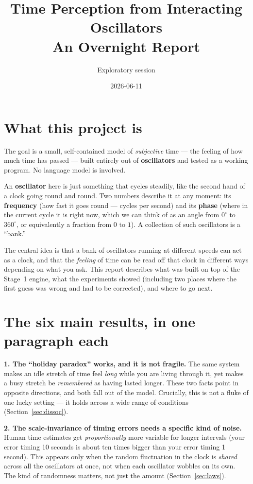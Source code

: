 \documentclass[11pt]{article}
\title{Time Perception from Interacting Oscillators\\\large An Overnight Report}
\author{Exploratory session}
\date{2026-06-11}
\begin{document}
\maketitle

\section*{What this project is}

The goal is a small, self-contained model of \emph{subjective} time --- the feeling
of how much time has passed --- built entirely out of \textbf{oscillators} and tested
as a working program. No language model is involved.

An \textbf{oscillator} here is just something that cycles steadily, like the second
hand of a clock going round and round. Two numbers describe it at any moment: its
\textbf{frequency} (how fast it goes round --- cycles per second) and its
\textbf{phase} (where in the current cycle it is right now, which we can think of as
an angle from $0^\circ$ to $360^\circ$, or equivalently a fraction from $0$ to $1$).
A collection of such oscillators is a ``bank.''

The central idea is that a bank of oscillators running at different speeds can act as
a clock, and that the \emph{feeling} of time can be read off that clock in different
ways depending on what you ask. This report describes what was built on top of the
Stage~1 engine, what the experiments showed (including two places where the first
guess was wrong and had to be corrected), and where to go next.

\section{The six main results, in one paragraph each}

\textbf{1. The ``holiday paradox'' works, and it is not fragile.}
The same system makes an idle stretch of time feel \emph{long} while you are living
through it, yet makes a busy stretch be \emph{remembered} as having lasted longer.
These two facts point in opposite directions, and both fall out of the model.
Crucially, this is not a fluke of one lucky setting --- it holds across a wide range
of conditions (Section~\ref{sec:dissoc}).

\textbf{2. The scale-invariance of timing errors needs a specific kind of noise.}
Human time estimates get \emph{proportionally} more variable for longer intervals
(your error timing 10 seconds is about ten times bigger than your error timing
1 second). This appears only when the random fluctuation in the clock is
\emph{shared} across all the oscillators at once, not when each oscillator wobbles on
its own. The kind of randomness matters, not just the amount
(Section~\ref{sec:laws}).
\end{document}
